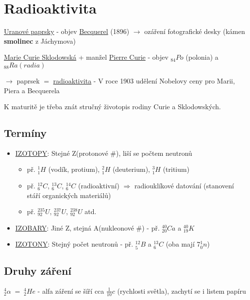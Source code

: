 \section{Radioaktivita}
\underline{Uranové paprsky} - objev \underline{Becquerel} (1896)
$\rightarrow$ ozáření fotografické desky (kámen \textbf{smolinec} z Jáchymova)

\vspace{1em}

\underline{Marie Curie Sklodowská} + manžel \underline{Pierre Curie} - objev $_{84}Po$ (polonia) a $_{88}Ra (radia)$

$\rightarrow$ paprsek $=$ \underline{radioaktivita} - V roce 1903 udělení Nobelovy ceny pro Marii, Piera a Becquerela

K maturitě je třeba znát stručný životopis rodiny Curie a Sklodowských.

\subsection{Termíny}

\begin{itemize}
    \item \underline{IZOTOPY}: Stejné Z(protonové \#), liší se počtem neutronů \begin{itemize}
        \item př. $^1_1H$ (vodík, protium), $^2_1H$ (deuterium), $^3_1H$ (tritium)
        \item př. $^{12}_6C$, $^{13}_6C$, $^{14}_6C$ (radioaktivní) $\Rightarrow$ radiouklíkové datování (stanovení stáří organických materiálů)
        \item př. $^{235}_{92}U$, $^{237}_{92}U$, $^{238}_{92}U$ atd.
        \end{itemize}
    \item \underline{IZOBARY}: Jiné Z, stejná A(nukleonové \#) - př. $^{40}_{20}Ca$ a $^{40}_{19}K$
    \item \underline{IZOTONY}: Stejný počet neutronů - př. $^{12}_5B$ a $^{13}_6C$ (oba mají 7$^1_0n$)
\end{itemize}

\subsection{Druhy záření}

$^4_2\alpha \; = \; ^4_2He$ - alfa záření se šíří cca $\frac{1}{10}c$ (rychlosti světla), zachytí se i listem papíru

\vspace{2em}

